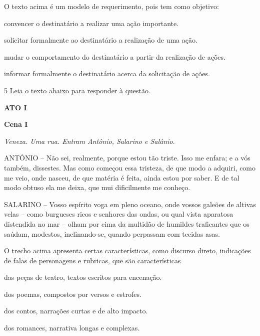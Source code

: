 O texto acima é um modelo de requerimento, pois tem como objetivo:

\begin{escolha} 

\item convencer o destinatário a realizar uma ação importante.

\item solicitar formalmente ao destinatário a realização de uma ação.

\item mudar o comportamento do destinatário a partir da realização de ações.

\item informar formalmente o destinatário acerca da solicitação de ações.

\end{escolha}

\num{5} Leia o texto abaixo para responder à questão.

\begin{myquote}

\textbf{ATO I}

\textbf{Cena I}

\textit{Veneza. Uma rua. Entram Antônio, Salarino e Salânio.}

ANTÔNIO -- Não sei, realmente, porque estou tão triste. Isso me enfara; e
a vós também, dissestes. Mas como começou essa tristeza, de que modo a
adquiri, como me veio, onde nasceu, de que matéria é feita, ainda estou
por saber. E de tal modo obtuso ela me deixa, que mui dificilmente me
conheço.

SALARINO -- Vosso espírito voga em pleno oceano, onde vossos galeões de
altivas velas -- como burgueses ricos e senhores das ondas, ou qual vista
aparatosa distendida no mar -- olham por cima da multidão de humildes
traficantes que os saúdam, modestos, inclinando-se, quando perpassam com
tecidas asas.


\end{myquote}

O trecho acima apresenta certas características, como discurso direto,
indicações de falas de personagens e rubricas, que são características 

\begin{escolha}

  \item das peças de teatro, textos escritos para encenação.

  \item dos poemas, compostos por versos e estrofes.

  \item dos contos, narrações curtas e de alto impacto.

  \item dos romances, narrativa longas e complexas.

\end{escolha}

